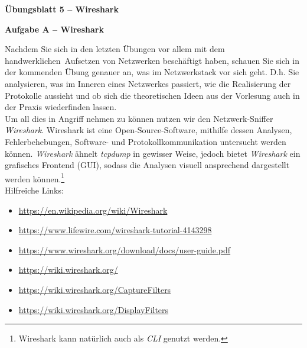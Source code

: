 \documentclass[paper=a4,fontsize=11pt]{scrartcl}%
\numberwithin{equation}{section}
\begin{document}
\begin{center}
\Large{\textbf{Übungsblatt 5 -- Wireshark}}
\end{center}
\begin{center}\Large{\textbf{Aufgabe A -- Wireshark}}\end{center}\vskip0.25in
Nachdem Sie sich in den letzten Übungen vor allem mit dem \glqq handwerklichen\grqq\ Aufsetzen von Netzwerken beschäftigt haben, schauen Sie sich in der kommenden Übung genauer an, was im Netzwerkstack vor sich geht. D.h. Sie analysieren, was im Inneren eines Netzwerkes passiert, wie die Realisierung der Protokolle aussieht und ob sich die theoretischen Ideen aus der Vorlesung auch in der Praxis wiederfinden lassen.\\
Um all dies in Angriff nehmen zu können nutzen wir den Netzwerk-Sniffer \emph{Wireshark}. Wireshark ist eine Open-Source-Software, mithilfe dessen Analysen, Fehlerbehebungen, Software- und Protokollkommunikation untersucht werden können. \emph{Wireshark} ähnelt \emph{tcpdump} in gewisser Weise, jedoch bietet \emph{Wireshark} ein grafisches Frontend (GUI), sodass die Analysen visuell ansprechend dargestellt werden können.\footnote{Wireshark kann natürlich auch als \emph{CLI} genutzt werden.} \\
Hilfreiche Links:
\begin{itemize}
	\item \url{https://en.wikipedia.org/wiki/Wireshark}
	\item \url{https://www.lifewire.com/wireshark-tutorial-4143298}
	\item \url{https://www.wireshark.org/download/docs/user-guide.pdf}
	\item \url{https://wiki.wireshark.org/}
	\item \url{https://wiki.wireshark.org/CaptureFilters}
	\item \url{https://wiki.wireshark.org/DisplayFilters}
\end{itemize}
\end{document}
